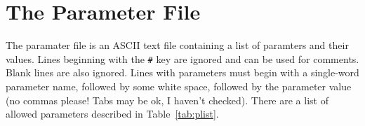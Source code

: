 \documentclass[a4paper,11pt]{report}
\begin{document}
\section{The Parameter File}
The paramater file is an ASCII text file containing a list of paramters and their values.
Lines beginning with the \lstinline|#| key are ignored and can be used for comments.
Blank lines are also ignored.
Lines with parameters must begin with a single-word parameter name, followed by some white space, followed by the parameter value (no commas please! Tabs may be ok, I haven't checked).
There are a list of allowed parameters described in Table~\ref{tab:plist}.
\end{document}
